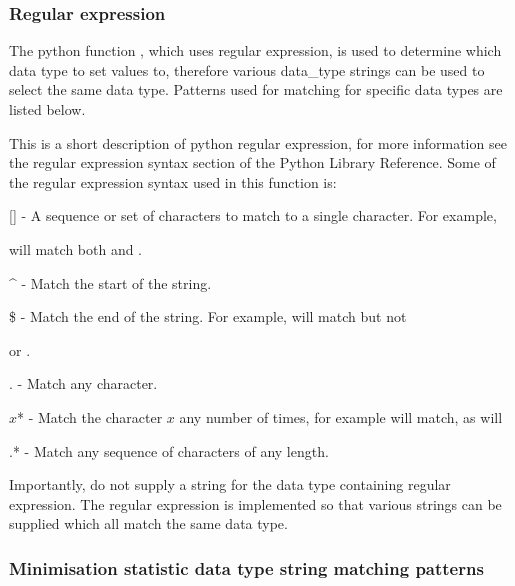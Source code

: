 




\subsubsection{Regular expression}

The python function 
, which uses regular expression, is used to determine which data
type to set values to, therefore various data\_type strings can be used to select the same
data type.  Patterns used for matching for specific data types are listed below.

This is a short description of python regular expression, for more information see the
regular expression syntax section of the Python Library Reference.  Some of the regular
expression syntax used in this function is:

    [] - A sequence or set of characters to match to a single character.  For example,
    
 will match both 
 and 
.

    \^{} - Match the start of the string.

    \$ - Match the end of the string.  For example, 
 will match 
 but not 

    or 
.

    . - Match any character.

    $x$* - Match the character $x$ any number of times, for example 
 will match, as will
    


    .* - Match any sequence of characters of any length.

Importantly, do not supply a string for the data type containing regular expression.  The
regular expression is implemented so that various strings can be supplied which all match
the same data type.


\subsubsection{Minimisation statistic data type string matching patterns}



